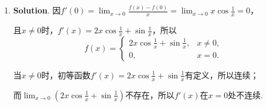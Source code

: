 \documentclass[../Main.tex]{subfiles}
\begin{document}
\begin{enumerate}
    \item \textbf{Solution}. 因$f'(0)=\lim_{x\to0}\frac{f(x)-f(0)}{x}=\lim_{x\to0}
              x\cos\frac{1}{x}=0$，

          且$x\neq0$时，$f'(x)=2x\cos\frac{1}{x}+\sin\frac{1}{x}$，所以
          \[
              f(x)=
              \begin{cases}
                  2x\cos\frac{1}{x}+\sin\frac{1}{x}, & x\neq 0, \\
                  0,                                 & x=0.
              \end{cases}
          \]

          当$x\neq0$时，初等函数$f'(x)=2x\cos\frac{1}{x}+\sin\frac{1}{x}$有定义，所以连续；

          而$\lim_{x\to0}\left(2x\cos\frac{1}{x}+\sin\frac{1}{x}\right)$不存在，所以$f
              '(x)$在$x=0$处不连续.
\end{enumerate}
\end{document}
